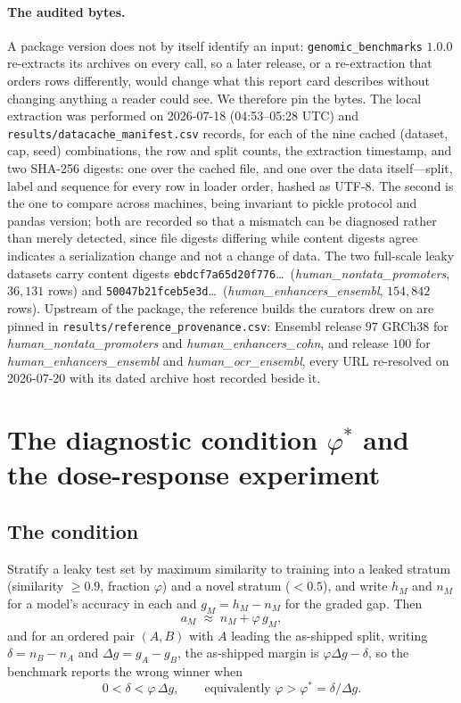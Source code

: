 \documentclass[11pt,a4paper]{article}
\begin{document}
\paragraph{The audited bytes.} A package version does not by itself identify an input:
\texttt{genomic\_benchmarks} $1.0.0$ re-extracts its archives on every call, so a later release, or
a re-extraction that orders rows differently, would change what this report card describes without
changing anything a reader could see. We therefore pin the bytes. The local extraction was performed
on 2026-07-18 (04:53--05:28 UTC) and \texttt{results/datacache\_manifest.csv} records, for each of
the nine cached (dataset, cap, seed) combinations, the row and split counts, the extraction
timestamp, and two SHA-256 digests: one over the cached file, and one over the data itself---split,
label and sequence for every row in loader order, hashed as UTF-8. The second is the one to compare
across machines, being invariant to pickle protocol and pandas version; both are recorded so that a
mismatch can be diagnosed rather than merely detected, since file digests differing while content
digests agree indicates a serialization change and not a change of data. The two full-scale leaky
datasets carry content digests \texttt{ebdcf7a65d20f776}\ldots\ (\textit{human\_nontata\_promoters},
$36{,}131$ rows) and \texttt{50047b21fceb5e3d}\ldots\ (\textit{human\_enhancers\_ensembl},
$154{,}842$ rows). Upstream of the package, the reference builds the curators drew on are pinned in
\texttt{results/reference\_provenance.csv}: Ensembl release $97$ GRCh38 for
\textit{human\_nontata\_promoters} and \textit{human\_enhancers\_cohn}, and release $100$ for
\textit{human\_enhancers\_ensembl} and \textit{human\_ocr\_ensembl}, every URL re-resolved on
2026-07-20 with its dated archive host recorded beside it.

\section{The diagnostic condition $\varphi^{*}$ and the dose-response experiment}\label{sec:s-phistar}

\subsection{The condition}
Stratify a leaky test set by maximum similarity to training into a leaked stratum (similarity
$\ge0.9$, fraction $\varphi$) and a novel stratum ($<0.5$), and write $h_M$ and $n_M$ for a model's
accuracy in each and $g_M=h_M-n_M$ for the graded gap. Then
\begin{equation}a_M\;\approx\;n_M+\varphi\,g_M,\label{eq:twostratum}\end{equation}
and for an ordered pair $(A,B)$ with $A$ leading the as-shipped split, writing $\delta=n_B-n_A$ and
$\Delta g=g_A-g_B$, the as-shipped margin is $\varphi\Delta g-\delta$, so the benchmark reports the
wrong winner when
\begin{equation}0<\delta<\varphi\,\Delta g,\qquad\text{equivalently }\varphi>\varphi^{*}=\delta/\Delta g.\label{eq:phistar}\end{equation}
\end{document}
